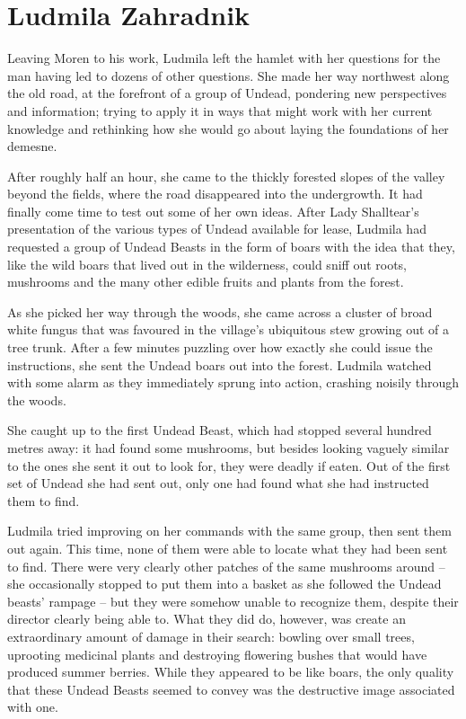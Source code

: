\chapter{Ludmila Zahradnik}

Leaving Moren to his work, Ludmila left the hamlet with her questions for the man having led to dozens of other questions. She made her way northwest along the old road, at the forefront of a group of Undead, pondering new perspectives and information; trying to apply it in ways that might work with her current knowledge and rethinking how she would go about laying the foundations of her demesne.

 

After roughly half an hour, she came to the thickly forested slopes of the valley beyond the fields, where the road disappeared into the undergrowth. It had finally come time to test out some of her own ideas. After Lady Shalltear's presentation of the various types of Undead available for lease, Ludmila had requested a group of Undead Beasts in the form of boars with the idea that they, like the wild boars that lived out in the wilderness, could sniff out roots, mushrooms and the many other edible fruits and plants from the forest.

 

As she picked her way through the woods, she came across a cluster of broad white fungus that was favoured in the village’s ubiquitous stew growing out of a tree trunk. After a few minutes puzzling over how exactly she could issue the instructions, she sent the Undead boars out into the forest. Ludmila watched with some alarm as they immediately sprung into action, crashing noisily through the woods.

 

She caught up to the first Undead Beast, which had stopped several hundred metres away: it had found some mushrooms, but besides looking vaguely similar to the ones she sent it out to look for, they were deadly if eaten. Out of the first set of Undead she had sent out, only one had found what she had instructed them to find.

 

Ludmila tried improving on her commands with the same group, then sent them out again. This time, none of them were able to locate what they had been sent to find. There were very clearly other patches of the same mushrooms around – she occasionally stopped to put them into a basket as she followed the Undead beasts’ rampage – but they were somehow unable to recognize them, despite their director clearly being able to. What they did do, however, was create an extraordinary amount of damage in their search: bowling over small trees, uprooting medicinal plants and destroying flowering bushes that would have produced summer berries. While they appeared to be like boars, the only quality that these Undead Beasts seemed to convey was the destructive image associated with one.

